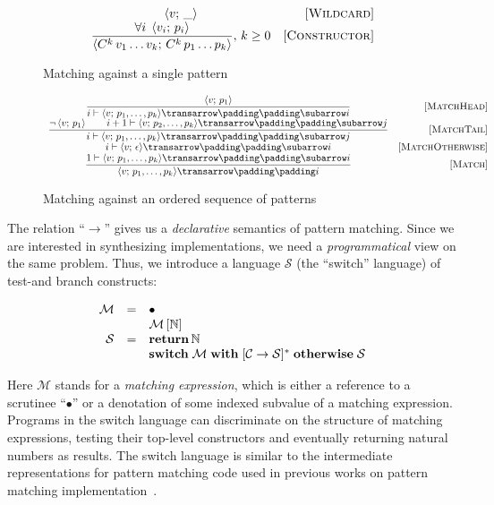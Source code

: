 \begin{figure}
   \renewcommand*{\arraystretch}{2}
   \[
   \begin{array}{cr}
     \left<{v;\,\_}\right> & \mbox{[\textsc{Wildcard}]} \\
     \dfrac{\forall i\;\left<{v_i;\,p_i}\right>}{\left<{C^k\,v_1\dots v_k;\,C^k\,p_1\dots p_k}\right>},\,k\ge 0 & \mbox{[\textsc{Constructor}]}
   \end{array}
   \]
   \caption{Matching against a single pattern}
   \label{fig:match1pat}
\end{figure}

\begin{figure}
   \renewcommand*{\arraystretch}{3}
   \setarrow{\xrightarrow}
   \setsubarrow{_*}
   \[
   \begin{array}{cr}
     \trule{\inbr{v;\,p_1}}
           {\withenv{i}{\trans{\inbr{v;\,p_1,\dots,p_k}}{}{i}}} & \ruleno{MatchHead}\\
     \trule{\neg\inbr{v;\,p_1}\qquad\withenv{i+1}{\trans{\inbr{v;\,p_2,\dots,p_k}}{}{j}}}
           {\withenv{i}{\trans{\inbr{v;\,p_1,\dots,p_k}}{}{j}}} & \ruleno{MatchTail}\\
     \withenv{i}{\trans{\inbr{v;\,\epsilon}}{}{i}} & \ruleno{MatchOtherwise}\\
     \trule{\withenv{1}{\trans{\inbr{v;\,p_1,\dots,p_k}}{}{i}}}
           {\setsubarrow{}\trans{\inbr{v;\,p_1,\dots,p_k}}{}{i}} & \ruleno{Match}
   \end{array}
   \]
   \caption{Matching against an ordered sequence of patterns}
   \label{fig:matchpatts}
\end{figure}

The relation ``$\xrightarrow{}{}$'' gives us a \emph{declarative} semantics of pattern matching. Since we are interested in
synthesizing implementations, we need a \emph{programmatical} view on the same problem. Thus, we introduce a language $\mathcal S$
(the ``switch'' language) of test-and branch constructs:

\[
\begin{array}{rcl}
  \mathcal M & = & \bullet \\
  &   & \mathcal M\,[\mathbb{N}] \\
  \mathcal{S} & = & \mathbf{return}\,\mathbb{N} \\
  &   & \mathbf{switch}\;\mathcal{M}\;\mathbf{with}\; [\mathcal{C}\; \mathbf{\rightarrow}\; \mathcal{S}]^*\;\mathbf{otherwise}\;\mathcal{S}
\end{array}
\]
 
Here $\mathcal{M}$ stands for a \emph{matching expression}, which is either a reference to a scrutinee ``$\bullet$'' or
a denotation of some indexed subvalue of a matching expression. Programs in the switch language can discriminate on the
structure of matching expressions, testing their top-level constructors and eventually returning natural numbers as results.
The switch language is similar to the intermediate representations for pattern matching code used in 
previous works on pattern matching implementation~\cite{maranget2001,maranget2008}.

